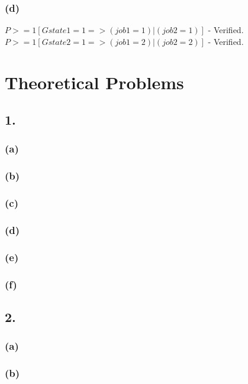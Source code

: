 \documentclass[12pt]{report}
\begin{document}
\subsubsection*{(d)}
$P>=1 [G state1=1=>(job1=1)|(job2=1)]$ - Verified.\\
$P>=1 [G state2=1=>(job1=2)|(job2=2)]$ - Verified.

\section*{Theoretical Problems}
\subsection*{1.}
\subsubsection*{(a)}

\subsubsection*{(b)}

\subsubsection*{(c)}

\subsubsection*{(d)}

\subsubsection*{(e)}

\subsubsection*{(f)}

\subsection*{2.}
\subsubsection*{(a)}

\subsubsection*{(b)}
\end{document}
